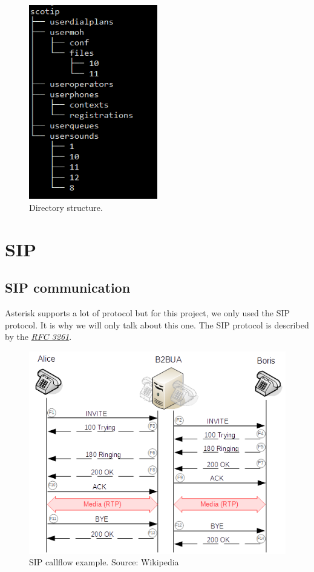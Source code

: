 \begin{figure}[!ht]
  \caption{Directory structure.}
  \centering
    \includegraphics[width=0.5\textwidth]{img/files_struct_conf.png}
\end{figure}


\section{SIP}

\subsection{SIP communication}
Asterisk supports a lot of protocol but for this project, we only used the SIP protocol. It is why we will only talk about this one.
The SIP protocol is described by the \href{http://www.rfc-base.org/rfc-3261.html}{\textit{RFC 3261}}.


\begin{figure}[H]
  \caption{SIP callflow example. Source: Wikipedia}
  \centering
    \includegraphics[width=1\textwidth]{img/callflow.png}
\end{figure}

